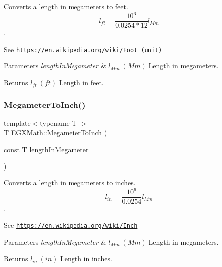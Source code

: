 Converts a length in megameters to feet. \[ l_{ft}= \frac{10^{6}}{0.0254 * 12} l_{Mm} \]. 

See \href{https://en.wikipedia.org/wiki/Foot_(unit)}{\tt https\+://en.\+wikipedia.\+org/wiki/\+Foot\+\_\+(unit)} 
\begin{DoxyParams}{Parameters}
{\em length\+In\+Megameter} & $ l_{Mm}\ (Mm)$ Length in megameters. \\
\hline
\end{DoxyParams}
\begin{DoxyReturn}{Returns}
$ l_{ft}\ (ft)$ Length in feet. 
\end{DoxyReturn}
\mbox{\label{group___e_g_x_math-_conversions-_length_conversions-_s_i-_megameter-_imperial_ga21eaef4c8ebcc2982ac3a212dc462a95}} 
\subsubsection{\texorpdfstring{Megameter\+To\+Inch()}{MegameterToInch()}}
{\footnotesize\ttfamily template$<$typename T $>$ \\
T E\+G\+X\+Math\+::\+Megameter\+To\+Inch (\begin{DoxyParamCaption}\item[{const T}]{length\+In\+Megameter }\end{DoxyParamCaption})}



Converts a length in megameters to inches. \[ l_{in}= \frac{10^{6}}{0.0254} l_{Mm} \]. 

See \href{https://en.wikipedia.org/wiki/Inch}{\tt https\+://en.\+wikipedia.\+org/wiki/\+Inch} 
\begin{DoxyParams}{Parameters}
{\em length\+In\+Megameter} & $ l_{Mm}\ (Mm)$ Length in megameters. \\
\hline
\end{DoxyParams}
\begin{DoxyReturn}{Returns}
$ l_{in}\ (in)$ Length in inches. 
\end{DoxyReturn}
\mbox{\label{group___e_g_x_math-_conversions-_length_conversions-_s_i-_megameter-_imperial_ga9494edd6659b7f69549d4fe96b9e2f98}} 
